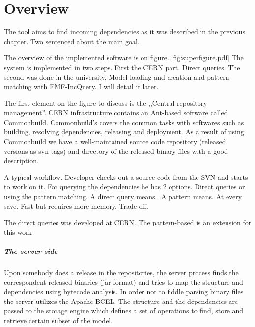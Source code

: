 \chapter{Overview}


The tool aims to find incoming dependencies as it was described in the previous chapter.
Two sentenced about the main goal.


The overview of the implemented software is on figure. \autoref{fig:superfigure.pdf}
The system is implemented in two steps. First the CERN part. Direct queries. The second was done in the university. Model  loading and creation and pattern matching with EMF-IncQuery. I will detail it later.

The first element on the figure to discuss is the ,,Central repository management''. CERN infrastructure contains an Ant-based software called Commonbuild. Commonbuild's covers the common tasks with softwares such as building, resolving dependencies, releasing and deployment. As a result of using Commonbuild we have a well-maintained source code repository (released versions as svn tags) and directory of the released binary files with a good description. 

A typical workflow. Developer checks out a source code from the SVN and starts to work on it. For querying the dependencies he has 2 options. Direct queries or using the pattern matching. A direct query means.. A pattern means. At every save. Fast but requires more memory. Trade-off. 

The direct queries was developed at CERN.
The pattern-based is an extension for this work

\paragraph{The server side} 
Upon somebody does a release in the repositories, the server process finds the correspondent released binaries (jar format) and tries to map the structure and dependencies using bytecode analysis. In order not to fiddle parsing binary files the server utilizes the Apache BCEL. The structure and the dependencies are passed to the storage engine which defines a set of operations to find, store and retrieve certain subset of the model. 

